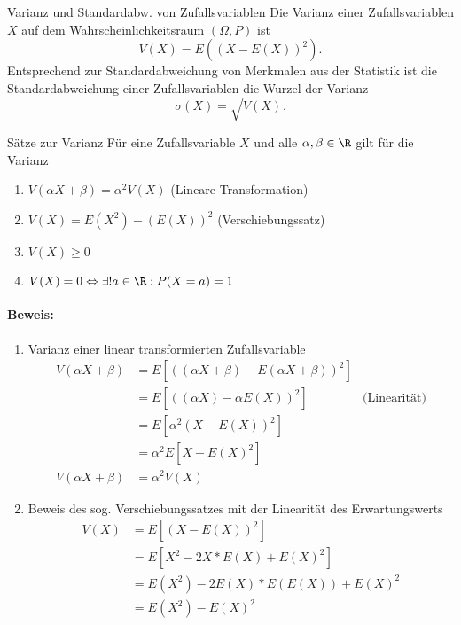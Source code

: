 \begin{definition}{Varianz und Standardabw. von Zufallsvariablen}
	Die Varianz einer Zufallsvariablen $X$ auf dem Wahrscheinlichkeitsraum $(\Omega,P)$ ist
	\begin{equation*}
		V(X)=E((X-E(X))^2).
	\end{equation*}
	Entsprechend zur Standardabweichung von Merkmalen aus der Statistik ist die Standardabweichung einer Zufallsvariablen die Wurzel der Varianz
	\begin{equation*}
		\sigma(X)=\sqrt{V(X)}.
	\end{equation*}
\end{definition}

\begin{satz}{Sätze zur Varianz}
	Für eine Zufallsvariable $X$ und alle $\alpha,\beta\in\R$ gilt für die Varianz
	\begin{enumerate}
		\item $V(\alpha X + \beta) = \alpha^2 V(X)$ (Lineare Transformation)
		\item $V(X)=E(X^2)-(E(X))^2$ (Verschiebungssatz)
		\item $V(X)\geq 0$
		\item $V(X)=0\Leftrightarrow   \exists!a\in\R: P(X=a)=1$
	\end{enumerate}
\end{satz}

\paragraph{Beweis:}
\begin{enumerate}
	\item Varianz einer linear transformierten Zufallsvariable
	\begin{align*}
		V(\alpha X + \beta)&=E[((\alpha X+\beta)-E(\alpha X+\beta))^2]\\
		&=E[((\alpha X)-\alpha E(X))^2] &\text{(Linearität)}\\
		&=E[\alpha^2(X-E(X))^2]\\ 
		&=\alpha^2E[X-E(X)^2]\\
		V(\alpha X + \beta)&=\alpha^2V(X)
	\end{align*}
	\item Beweis des sog. Verschiebungssatzes mit der Linearität des Erwartungswerts
	\begin{align*}
		V(X)&=E[(X-E(X))^2]\\
		&=E[X^2-2X*E(X)+E(X)^2]\\
		&=E(X^2)-2E(X)*E(E(X))+E(X)^2\\
		&=E(X^2)-E(X)^2\\
	\end{align*}
\end{enumerate}

